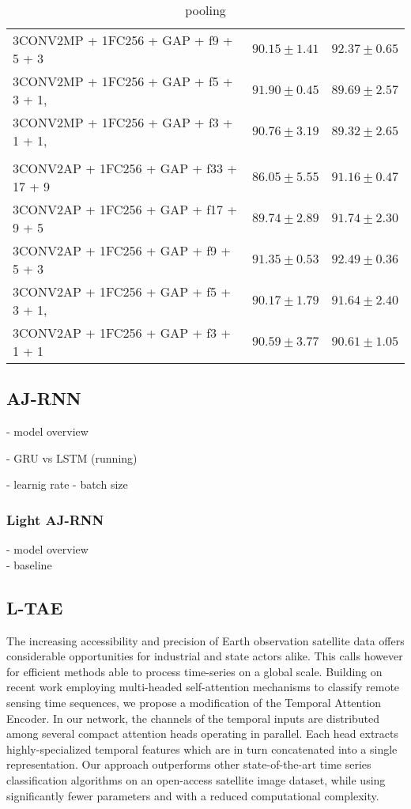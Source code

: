 \begin{table}[!htbp]
\begin{tabular}{lrr}
    3CONV2MP + 1FC256 + GAP + f9 + 5 + 3  	 & $90.15 \pm 1.41$ 	 & $92.37 \pm 0.65$\\
    3CONV2MP + 1FC256 + GAP + f5 + 3 + 1,  	 & $91.90 \pm 0.45$ 	 & $89.69 \pm 2.57$\\
    3CONV2MP + 1FC256 + GAP + f3 + 1 + 1,  	 & $90.76 \pm 3.19$ 	 & $89.32 \pm 2.65$
    \\[0.2cm] \hline \\[-0.2cm]
    3CONV2AP + 1FC256 + GAP + f33 + 17 + 9  	 & $86.05 \pm 5.55$ 	 & $91.16 \pm 0.47$\\
    3CONV2AP + 1FC256 + GAP + f17 + 9 + 5  	 & $89.74 \pm 2.89$ 	 & $91.74 \pm 2.30$\\
    3CONV2AP + 1FC256 + GAP + f9 + 5 + 3  	 & $91.35 \pm 0.53$ 	 & $92.49 \pm 0.36$\\
    3CONV2AP + 1FC256 + GAP + f5 + 3 + 1,  	 & $90.17 \pm 1.79$ 	 & $91.64 \pm 2.40$\\
    3CONV2AP + 1FC256 + GAP + f3 + 1 + 1  	 & $90.59 \pm 3.77$ 	 & $90.61 \pm 1.05$\\
   \end{tabular}
   \caption{pooling}
 \end{table}



\pagebreak
\subsection{AJ-RNN}
- model overview

- GRU vs LSTM (running)

- learnig rate
- batch size 

\subsubsection{Light AJ-RNN}
- model overview\\
- baseline
\pagebreak
\subsection{L-TAE}
The increasing accessibility and precision of Earth observation satellite data offers considerable opportunities for industrial and state actors alike. This calls however for efficient methods able to process time-series on a global scale. Building on recent work employing multi-headed self-attention mechanisms to classify remote sensing time sequences, we propose a modification of the Temporal Attention Encoder. In our network, the channels of the temporal inputs are distributed among several compact attention heads operating in parallel. Each head extracts highly-specialized temporal features which are in turn concatenated into a single representation. Our approach outperforms other state-of-the-art time series classification algorithms on an open-access satellite image dataset, while using significantly fewer parameters and with a reduced computational complexity.

